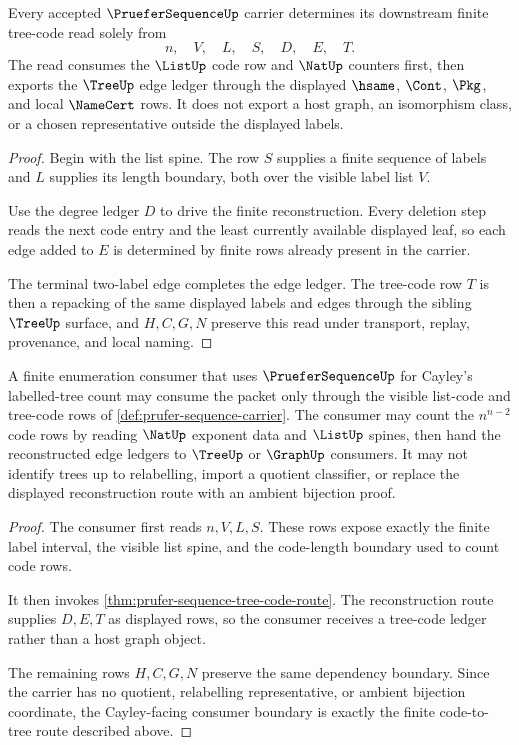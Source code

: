 \begin{theorem}
\label{thm:prufer-sequence-tree-code-route}
Every accepted $\PrueferSequenceUp$ carrier determines its downstream finite tree-code read solely from
$$
n,\quad V,\quad L,\quad S,\quad D,\quad E,\quad T.
$$
The read consumes the $\ListUp$ code row and $\NatUp$ counters first, then exports the $\TreeUp$ edge ledger through the displayed $\hsame$, $\Cont$, $\Pkg$, and local $\NameCert$ rows. It does not export a host graph, an isomorphism class, or a chosen representative outside the displayed labels.
\end{theorem}
\begin{proof}
Begin with the list spine. The row $S$ supplies a finite sequence of labels and $L$ supplies its length boundary, both over the visible label list $V$.

Use the degree ledger $D$ to drive the finite reconstruction. Every deletion step reads the next code entry and the least currently available displayed leaf, so each edge added to $E$ is determined by finite rows already present in the carrier.

The terminal two-label edge completes the edge ledger. The tree-code row $T$ is then a repacking of the same displayed labels and edges through the sibling $\TreeUp$ surface, and $H,C,G,N$ preserve this read under transport, replay, provenance, and local naming.
\end{proof}

\begin{theorem}
\label{thm:prufer-sequence-cayley-consumer-boundary}
A finite enumeration consumer that uses $\PrueferSequenceUp$ for Cayley's labelled-tree count may consume the packet only through the visible list-code and tree-code rows of \autoref{def:prufer-sequence-carrier}. The consumer may count the $n^{n-2}$ code rows by reading $\NatUp$ exponent data and $\ListUp$ spines, then hand the reconstructed edge ledgers to $\TreeUp$ or $\GraphUp$ consumers. It may not identify trees up to relabelling, import a quotient classifier, or replace the displayed reconstruction route with an ambient bijection proof.
\end{theorem}
\begin{proof}
The consumer first reads $n,V,L,S$. These rows expose exactly the finite label interval, the visible list spine, and the code-length boundary used to count code rows.

It then invokes \autoref{thm:prufer-sequence-tree-code-route}. The reconstruction route supplies $D,E,T$ as displayed rows, so the consumer receives a tree-code ledger rather than a host graph object.

The remaining rows $H,C,G,N$ preserve the same dependency boundary. Since the carrier has no quotient, relabelling representative, or ambient bijection coordinate, the Cayley-facing consumer boundary is exactly the finite code-to-tree route described above.
\end{proof}

